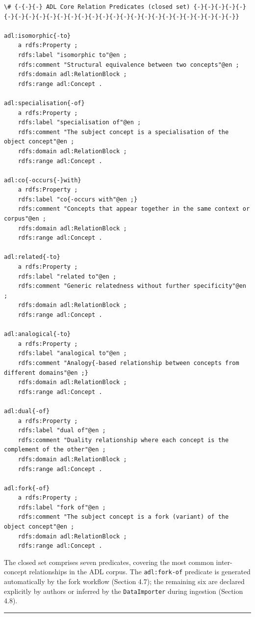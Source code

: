 \begin{lstlisting}
\# {-{-}{-} ADL Core Relation Predicates (closed set) {-}{-}{-}{-}{-}{-}{-}{-}{-}{-}{-}{-}{-}{-}{-}{-}{-}{-}{-}{-}{-}{-}{-}{-}{-}{-}{-}}

adl:isomorphic{-to}
    a rdfs:Property ;
    rdfs:label "isomorphic to"@en ;
    rdfs:comment "Structural equivalence between two concepts"@en ;
    rdfs:domain adl:RelationBlock ;
    rdfs:range adl:Concept .

adl:specialisation{-of}
    a rdfs:Property ;
    rdfs:label "specialisation of"@en ;
    rdfs:comment "The subject concept is a specialisation of the object concept"@en ;
    rdfs:domain adl:RelationBlock ;
    rdfs:range adl:Concept .

adl:co{-occurs{-}with}
    a rdfs:Property ;
    rdfs:label "co{-occurs with"@en ;}
    rdfs:comment "Concepts that appear together in the same context or corpus"@en ;
    rdfs:domain adl:RelationBlock ;
    rdfs:range adl:Concept .

adl:related{-to}
    a rdfs:Property ;
    rdfs:label "related to"@en ;
    rdfs:comment "Generic relatedness without further specificity"@en ;
    rdfs:domain adl:RelationBlock ;
    rdfs:range adl:Concept .

adl:analogical{-to}
    a rdfs:Property ;
    rdfs:label "analogical to"@en ;
    rdfs:comment "Analogy{-based relationship between concepts from different domains"@en ;}
    rdfs:domain adl:RelationBlock ;
    rdfs:range adl:Concept .

adl:dual{-of}
    a rdfs:Property ;
    rdfs:label "dual of"@en ;
    rdfs:comment "Duality relationship where each concept is the complement of the other"@en ;
    rdfs:domain adl:RelationBlock ;
    rdfs:range adl:Concept .

adl:fork{-of}
    a rdfs:Property ;
    rdfs:label "fork of"@en ;
    rdfs:comment "The subject concept is a fork (variant) of the object concept"@en ;
    rdfs:domain adl:RelationBlock ;
    rdfs:range adl:Concept .
\end{lstlisting}

The closed set comprises seven predicates, covering the most common inter-concept relationships in the ADL corpus. The \texttt{adl:fork-of} predicate is generated automatically by the fork workflow (Section 4.7); the remaining six are declared explicitly by authors or inferred by the \texttt{DataImporter} during ingestion (Section 4.8).

\begin{center}\rule{0.5\linewidth}{0.5pt}\end{center}


